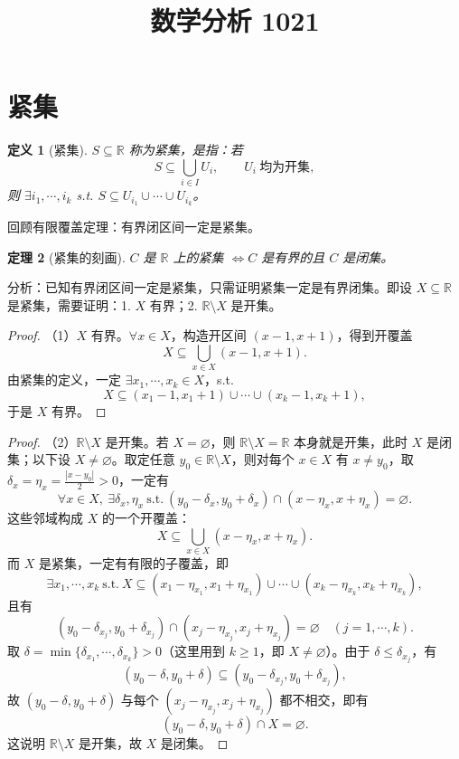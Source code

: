 \documentclass[UTF8,11pt]{ctexart}
\title{数学分析 1021}
\date{}
\theoremstyle{cnthm}
\newtheorem{thm}{定理}[section]
\newtheorem{defn}[thm]{定义}
\begin{document}
\maketitle

\section{紧集}

\begin{defn}[紧集]
$S\subseteq\mathbb{R}$ 称为紧集，是指：若
\[
S\subseteq\bigcup_{i\in I}U_i,\qquad U_i\ \text{均为开集},
\]
则 $\exists i_1,\cdots,i_k$ s.t. $S\subseteq U_{i_1}\cup\cdots\cup U_{i_k}$。
\end{defn}

回顾有限覆盖定理：有界闭区间一定是紧集。

\begin{thm}[紧集的刻画]
$C$ 是 $\mathbb{R}$ 上的紧集 $\iff C$ 是有界的且 $C$ 是闭集。
\end{thm}

分析：已知有界闭区间一定是紧集，只需证明紧集一定是有界闭集。即设 $X\subseteq\mathbb{R}$ 是紧集，需要证明：1. $X$ 有界；2. $\mathbb{R}\setminus X$ 是开集。

\begin{proof}
（1）$X$ 有界。$\forall x\in X$，构造开区间 $(x-1,x+1)$，得到开覆盖
\[
X\subseteq\bigcup_{x\in X}(x-1,x+1).
\]
由紧集的定义，一定 $\exists x_1,\cdots,x_k\in X$，s.t.
\[
X\subseteq(x_1-1,x_1+1)\cup\cdots\cup(x_k-1,x_k+1),
\]
于是 $X$ 有界。
\end{proof}

\begin{proof}
（2）$\mathbb{R}\setminus X$ 是开集。若 $X=\varnothing$，则 $\mathbb{R}\setminus X=\mathbb{R}$ 本身就是开集，此时 $X$ 是闭集；以下设 $X\neq\varnothing$。取定任意 $y_0\in\mathbb{R}\setminus X$，则对每个 $x\in X$ 有 $x\neq y_0$，取 $\delta_x=\eta_x=\frac{|x-y_0|}{2}>0$，一定有
\[
\forall x\in X,\ \exists\delta_x,\eta_x\ \text{s.t.}\
(y_0-\delta_x,y_0+\delta_x)\cap(x-\eta_x,x+\eta_x)=\varnothing.
\]
这些邻域构成 $X$ 的一个开覆盖：
\[
X\subseteq\bigcup_{x\in X}(x-\eta_x,x+\eta_x).
\]
而 $X$ 是紧集，一定有有限的子覆盖，即
\[
\exists x_1,\cdots,x_k\ \text{s.t.}\
X\subseteq(x_1-\eta_{x_1},x_1+\eta_{x_1})\cup\cdots\cup(x_k-\eta_{x_k},x_k+\eta_{x_k}),
\]
且有
\[
(y_0-\delta_{x_j},y_0+\delta_{x_j})\cap(x_j-\eta_{x_j},x_j+\eta_{x_j})=\varnothing
\quad(j=1,\cdots,k).
\]
取 $\delta=\min\{\delta_{x_1},\cdots,\delta_{x_k}\}>0$（这里用到 $k\ge 1$，即 $X\neq\varnothing$）。由于 $\delta\le\delta_{x_j}$，有
\[
(y_0-\delta,y_0+\delta)\subseteq(y_0-\delta_{x_j},y_0+\delta_{x_j}),
\]
故 $(y_0-\delta,y_0+\delta)$ 与每个 $(x_j-\eta_{x_j},x_j+\eta_{x_j})$ 都不相交，即有
\[
(y_0-\delta,y_0+\delta)\cap X=\varnothing.
\]
这说明 $\mathbb{R}\setminus X$ 是开集，故 $X$ 是闭集。
\end{proof}
\end{document}
